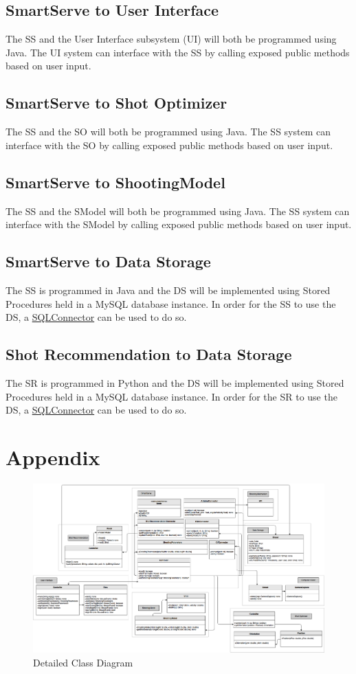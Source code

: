 \documentclass[11pt]{article}
\begin{document}
\subsection{SmartServe to User Interface}
The SS and the User Interface subsystem (UI) will both be programmed using Java. The UI system can interface with the SS by calling exposed public methods based on user input.
\subsection{SmartServe to Shot Optimizer}
The SS and the SO will both be programmed using Java. The SS system can interface with the SO by calling exposed public methods based on user input.
\subsection{SmartServe to ShootingModel}
The SS and the SModel will both be programmed using Java. The SS system can interface with the SModel by calling exposed public methods based on user input.
\subsection{SmartServe to Data Storage}
The SS is programmed in Java and the DS will be implemented using Stored Procedures held in a MySQL database instance. In order for the SS to use the DS, a \href{https://dev.mysql.com/downloads/connector/j/5.1.html}{SQLConnector} can be used to do so.
\subsection{Shot Recommendation to Data Storage}
The SR is programmed in Python and the DS will be implemented using Stored Procedures held in a MySQL database instance. In order for the SR to use the DS, a \href{https://dev.mysql.com/doc/connector-python/en/}{SQLConnector} can be used to do so.

\section{Appendix}

\begin{figure}
   \centering
   \includegraphics[width=1.1\textwidth]{diagram/DCD.png} %
   \caption{Detailed Class Diagram}
   \label{fig:dcd}
\end{figure}
\end{document}
